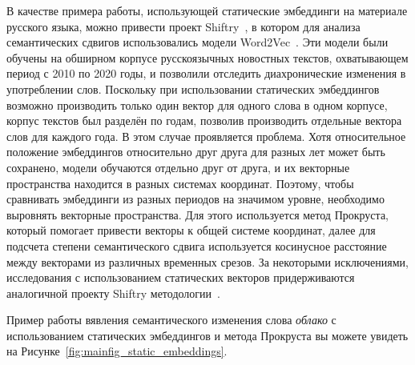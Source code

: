 \documentclass[LI,VKR]{HSEUniversity}
\begin{document}
В качестве примера работы, использующей статические эмбеддинги на материале русского языка,
можно привести проект Shiftry~\cite{shiftry},
в котором для анализа семантических сдвигов использовались модели Word2Vec~\cite{Word2VecModelAnalysis}.
Эти модели были обучены на обширном корпусе русскоязычных новостных текстов,
охватывающем период с 2010 по 2020 годы, и позволили отследить диахронические изменения
в употреблении слов.
Поскольку при использовании статических эмбеддингов возможно производить
только один вектор для одного слова в одном корпусе,
корпус текстов был разделён по годам,
позволив производить отдельные вектора слов для каждого года.
В этом случае проявляется проблема.
Хотя относительное положение эмбеддингов относительно друг друга для разных лет может быть сохранено,
модели обучаются отдельно друг от друга,
и их векторные пространства находится в разных системах координат.
Поэтому, чтобы сравнивать эмбеддинги из разных периодов на значимом уровне,
необходимо выровнять векторные пространства.
Для этого используется метод Прокруста, который помогает привести векторы к общей системе координат,
далее для подсчета степени семантического сдвига используется косинусное расстояние между
векторами из различных временных срезов.
За некоторыми исключениями, исследования с использованием статических векторов
придерживаются аналогичной проекту Shiftry методологии~\cite{TahmasebiComputationalApproachesToSemanticChange}.

Пример работы вявления семантического изменения слова \textit{облако} с использованием
статических эмбеддингов и метода Прокруста вы можете увидеть на Рисунке~\ref{fig:mainfig_static_embeddings}.
\end{document}
